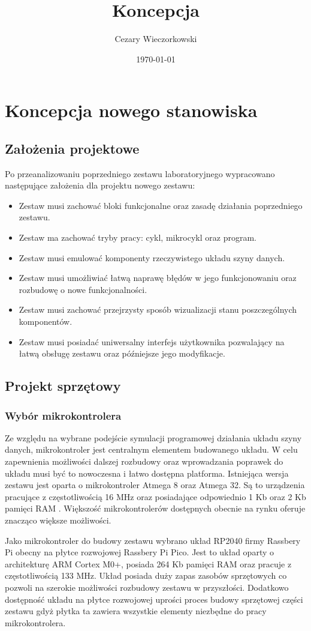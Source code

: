 \documentclass[../main.tex]{subfiles}
\author{Cezary Wieczorkowski}
\date{\today}
\title{Koncepcja}
\begin{document}
\section{Koncepcja nowego stanowiska}

\subsection{Założenia projektowe}

    Po przeanalizowaniu poprzedniego zestawu laboratoryjnego wypracowano następujące założenia dla projektu nowego zestawu:
    \begin{itemize}
    \item Zestaw musi zachować bloki funkcjonalne oraz zasadę działania poprzedniego zestawu.
    \item Zestaw ma zachować tryby pracy: cykl, mikrocykl oraz program.
    \item Zestaw musi emulować komponenty rzeczywistego układu szyny danych.
    \item Zestaw musi umożliwiać łatwą naprawę błędów w jego funkcjonowaniu oraz rozbudowę o nowe funkcjonalności.
    \item Zestaw musi zachować przejrzysty sposób wizualizacji stanu poszczególnych komponentów.
    \item Zestaw musi posiadać uniwersalny interfejs użytkownika pozwalający na łatwą obsługę zestawu oraz późniejsze jego modyfikacje.
    \end{itemize}

\subsection{Projekt sprzętowy}

    \subsubsection{Wybór mikrokontrolera}

    Ze względu na wybrane podejście symulacji programowej działania układu szyny danych, mikrokontroler jest centralnym elementem budowanego układu.
    W celu zapewnienia możliwości dalszej rozbudowy oraz wprowadzania poprawek do układu musi być to nowoczesna i łatwo dostępna platforma. 
    Istniejąca wersja zestawu jest oparta o mikrokontroler Atmega 8 oraz Atmega 32. Są to urządzenia pracujące z częstotliwością 16 MHz oraz 
    posiadające odpowiednio 1 Kb oraz 2 Kb pamięci RAM \cite{at:atmega8} \cite{at:atmega32}. Większość mikrokontrolerów dostępnych obecnie na 
    rynku oferuje znacząco większe możliwości. 
    \par
    Jako mikrokontroler do budowy zestawu wybrano układ RP2040 firmy Rassbery Pi \cite{rp:rp2040} obecny na płytce rozwojowej Rassbery Pi Pico. 
    Jest to układ oparty o architekturę ARM Cortex M0+, posiada 264 Kb pamięci RAM oraz pracuje z częstotliwością 133 MHz. Układ posiada duży zapas
    zasobów sprzętowych co pozwoli na szerokie możliwości rozbudowy zestawu w przyszłości. Dodatkowo dostępność układu na płytce rozwojowej uprości
    proces budowy sprzętowej części zestawu gdyż płytka ta zawiera wszystkie elementy niezbędne do pracy mikrokontrolera.
\end{document}
